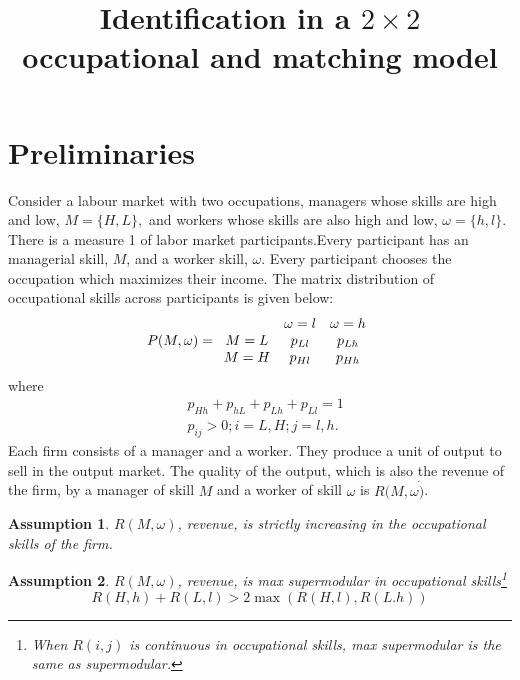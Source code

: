 \documentclass[12 pt]{article}
\title{Identification in a $2\times2$ occupational and matching
	model}
\date{}
\newtheorem{assumption}{Assumption} %
\begin{document}
	
	\maketitle
	
	\onehalfspacing
	
	\vspace{-2cm}
	
	\section{Preliminaries}
	

Consider a labour market with two occupations, managers whose skills are high and low, $M=\{H,L\},$ and workers whose skills are also high and low, $\omega=\{h,l\}$. There is a measure 1 of labor market participants.Every participant has an managerial skill, $M$, and a worker skill, $\omega$. Every participant chooses the occupation which maximizes their income. The matrix distribution of occupational skills across participants is given below:%
\[
P(M,\omega)=%
\begin{array}
	[c]{ccc}
	& \omega=l & \omega=h\\
	M=L & p_{Ll} & p_{Lh}\\
	M=H & p_{Hl} & p_{Hh}%
\end{array}
\]
where
\begin{align}
	&  p_{Hh}+p_{hL}+p_{Lh}+p_{Ll}=1\\
	& p_{ij}   >0;i=L,H;j=l,h.
\end{align}
Each firm consists of a manager and a worker. They produce a unit of output to sell in the output market. The quality of the output, which is also the revenue of the firm, by a manager of skill $M$ and a worker of skill $\omega$ is $R(M,\omega\dot{)}$.
\begin{assumption}
	$R(M,\omega)$, revenue, is strictly
	increasing in the occupational skills of the firm.
	\label{a1}
\end{assumption}
\begin{assumption}
	$R(M,\omega)$, revenue, is max supermodular
	in occupational skills\footnote{When $R(i,j)$ is continuous in occupational
	skills, max supermodular is the same as supermodular.}	
	\begin{equation}
		R(H,h)+R(L,l)>2\max(R(H,l),R(L.h))
		\label{maxsupermodular}
	\end{equation}
		\label{a2}
\end{assumption}
\end{document}
